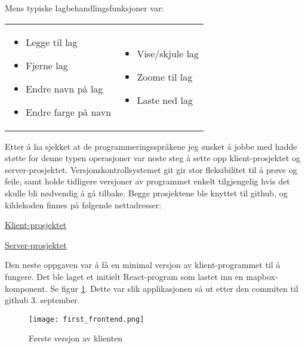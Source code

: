 Mens typiske lagbehandlingsfunksjoner var:

\begin{frame}

    \begin{tabular}{p{}p{}}

        \begin{itemize}
            \item Legge til lag
            \item Fjerne lag
            \item Endre navn på lag
            \item Endre farge på navn
        \end{itemize} &

        \begin{itemize}
            \item Vise/skjule lag
            \item Zoome til lag
            \item Laste ned lag
        \end{itemize}
    \end{tabular}

\end{frame}

Etter å ha sjekket at de programmeringsspråkene jeg ønsket å jobbe med hadde støtte for denne typen operasjoner var neste steg å sette opp klient-prosjektet og server-prosjektet. Versjonskontrollsystemet git gir stor fleksibilitet til å prøve og feile, samt holde tidligere versjoner av programmet enkelt tilgjengelig hvis det skulle bli nødvendig å gå tilbake. Begge prosjektene ble knyttet til github, og kildekoden finnes på følgende nettadresser:

\href{https://github.com/torsol/PiG-frontend}{Klient-prosjektet}

\href{https://github.com/torsol/PiG-backend}{Server-prosjektet}

Den neste oppgaven var å få en minimal versjon av klient-programmet til å fungere. Det ble laget et initielt React-program som lastet inn en mapbox-komponent. Se figur \ref{fig:firstmap}. Dette var slik applikasjonen så ut etter den commiten til github 3. september. 

\begin{figure}[h]
    \center
    \texttt{[image: first\_frontend.png]}
    \caption{Første versjon av klienten}
    \label{fig:firstmap}
\end{figure}

